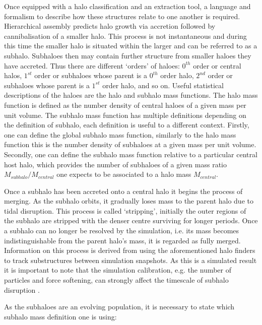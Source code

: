 Once equipped with a halo classification and an extraction tool, a language and formalism to describe how these structures relate to one another is required. Hierarchical assembly predicts halo growth via accretion followed by cannibalisation of a smaller halo. This process is not instantaneous and during this time the smaller halo is situated within the larger and can be referred to as a subhalo. Subhaloes then may contain further structure from smaller haloes they have accreted. Thus there are different `orders' of haloes: $0^{th}$ order or central halos, $1^{st}$ order or subhaloes whose parent is a $0^{th}$ order halo, $2^{nd}$ order or subhaloes whose parent is a $1^{st}$ order halo, and so on. Useful statistical descriptions of the haloes are the halo and subhalo mass functions. The halo mass function is defined as the number density of central haloes of a given mass per unit volume. The subhalo mass function has multiple definitions depending on the definition of subhalo, each definition is useful to a different context. Firstly, one can define the global subhalo mass function, similarly to the halo mass function this is the number density of subhaloes at a given mass per unit volume. Secondly, one can define the subhalo mass function relative to a particular central host halo, which provides the number of subhaloes of a given mass ratio $M_{subhalo}/M_{central}$ one expects to be associated to a halo mass $M_{central}$. 


Once a subhalo has been accreted onto a central halo it begins the process of merging. As the subhalo orbits, it gradually loses mass to the parent halo due to tidal disruption. This process is called `stripping', initially the outer regions of the subhalo are stripped with the denser centre surviving for longer periods. Once a subhalo can no longer be resolved by the simulation, i.e. its mass becomes indistinguishable from the parent halo's mass, it is regarded as fully merged. Information on this process is derived from using the aforementioned halo finders to track substructures between simulation snapshots. As this is a simulated result it is important to note that the simulation calibration, e.g. the number of particles and force softening, can strongly affect the timescale of subhalo disruption \cite{vandenBosch2018DarkDisruption}.

As the subhaloes are an evolving population, it is necessary to state which subhalo mass definition one is using:

